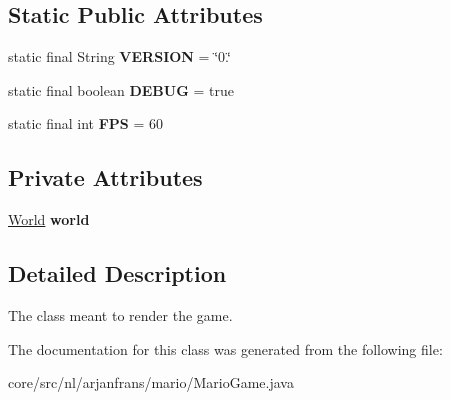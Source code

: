 \subsection*{Static Public Attributes}
\begin{DoxyCompactItemize}
\item 
\mbox{\label{classnl_1_1arjanfrans_1_1mario_1_1MarioGame_a0b84320779d5ffb3cea028477669a27a}} 
static final String {\bfseries V\+E\+R\+S\+I\+ON} = \char`\"{}0.\char`\"{}
\item 
\mbox{\label{classnl_1_1arjanfrans_1_1mario_1_1MarioGame_a8384a6d9e3db1e7aef33e9ffe3b3fd29}} 
static final boolean {\bfseries D\+E\+B\+UG} = true
\item 
\mbox{\label{classnl_1_1arjanfrans_1_1mario_1_1MarioGame_ac475b747d4a93178a0ddccd757ab5099}} 
static final int {\bfseries F\+PS} = 60
\end{DoxyCompactItemize}
\subsection*{Private Attributes}
\begin{DoxyCompactItemize}
\item 
\mbox{\label{classnl_1_1arjanfrans_1_1mario_1_1MarioGame_ac9b0b84fd35672fdc4b6c3fdfb7ac65c}} 
\hyperlink{classnl_1_1arjanfrans_1_1mario_1_1model_1_1World}{World} {\bfseries world}
\end{DoxyCompactItemize}


\subsection{Detailed Description}
The class meant to render the game. 

The documentation for this class was generated from the following file\+:\begin{DoxyCompactItemize}
\item 
core/src/nl/arjanfrans/mario/Mario\+Game.\+java\end{DoxyCompactItemize}
